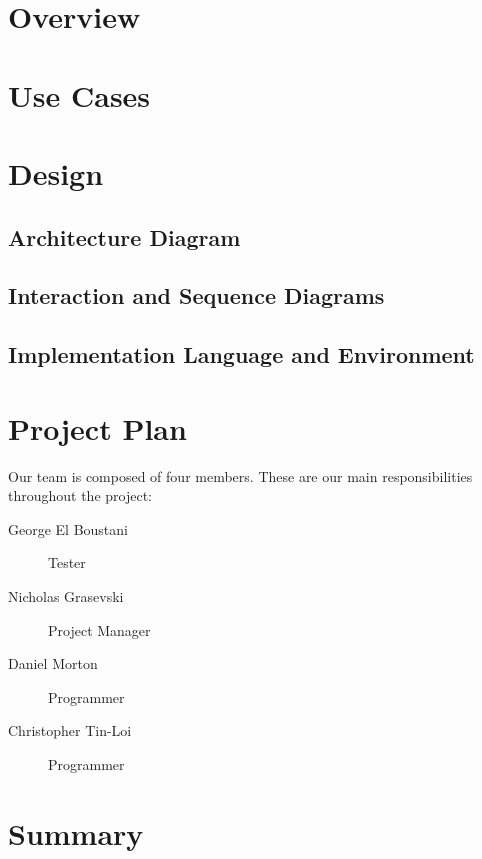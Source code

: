 \documentclass{article}
\begin{document}
\maketitle


\section{Overview}


\section{Use Cases}


\section{Design}
\subsection{Architecture Diagram}

\subsection{Interaction and Sequence Diagrams}

\subsection{Implementation Language and Environment}


\section{Project Plan}

Our team is composed of four members. These are our main responsibilities throughout the project:
\begin{description}
  \item[George El Boustani] Tester
  \item[Nicholas Grasevski] Project Manager
  \item[Daniel Morton] Programmer
  \item[Christopher Tin-Loi] Programmer
\end{description}


\section{Summary}
\end{document}
